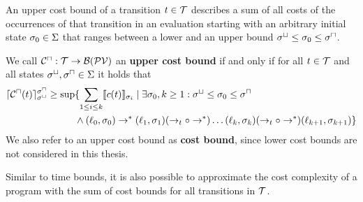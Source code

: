 An upper cost bound of a transition $t \in \mathcal{T}$ describes a sum of all costs of the occurrences of that transition in an evaluation starting with an arbitrary initial state $\sigma_0 \in \Sigma$ that ranges between a lower and an upper bound ${\sigma^\sqcup} \leq \sigma_0 \leq {\sigma^\sqcap}$.

\begin{definition}
  We call ${\mathcal{C}^\sqcap}: \mathcal{T} \rightarrow \mathcal{B}(\mathcal{PV})$ an \textbf{upper cost bound} if and only if for all $t \in \mathcal{T}$ and all states ${\sigma^\sqcup}, {\sigma^\sqcap} \in \Sigma$ it holds that
  \begin{align*}
    \lceil {\mathcal{C}^\sqcap}(t) \rceil^{{\sigma^\sqcap}}_{{\sigma^\sqcup}} \geq \sup & \lbrace  \sum_{1 \leq i \leq k} \llbracket c(t) \rrbracket_{\sigma_i} \mid \exists \sigma_0, k \geq 1: {\sigma^\sqcup} \leq \sigma_0 \leq {\sigma^\sqcap} \\
      & \wedge (\ell_0, \sigma_0) \rightarrow^* (\ell_1, \sigma_1) (\rightarrow_t \circ \rightarrow^*) \dots (\ell_k, \sigma_k) (\rightarrow_t \circ \rightarrow^*) (\ell_{k+1}, \sigma_{k+1})  \rbrace
  \end{align*}
  We also refer to an upper cost bound as \textbf{cost bound}, since lower cost bounds are not considered in this thesis.
\end{definition}

Similar to time bounds, it is also possible to approximate the cost complexity of a program with the sum of cost bounds for all transitions in $\mathcal{T}$.


